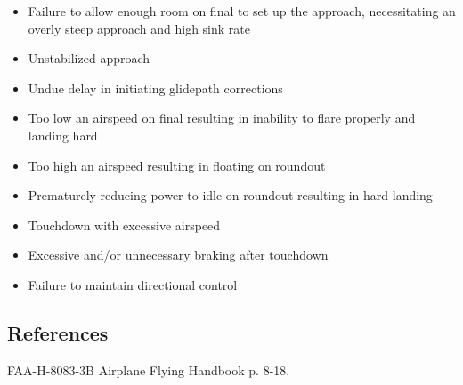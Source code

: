 \begin{itemize}
  \item Failure to allow enough room on final to set up the approach,
    necessitating an overly steep approach and high sink rate
  \item Unstabilized approach
  \item Undue delay in initiating glidepath corrections
  \item Too low an airspeed on final resulting in inability to flare properly
    and landing hard
  \item Too high an airspeed resulting in floating on roundout
  \item Prematurely reducing power to idle on roundout resulting in hard
    landing
  \item Touchdown with excessive airspeed
  \item Excessive and/or unnecessary braking after touchdown
  \item Failure to maintain directional control
\end{itemize}

\subsection{References}

FAA-H-8083-3B Airplane Flying Handbook p. 8-18.
